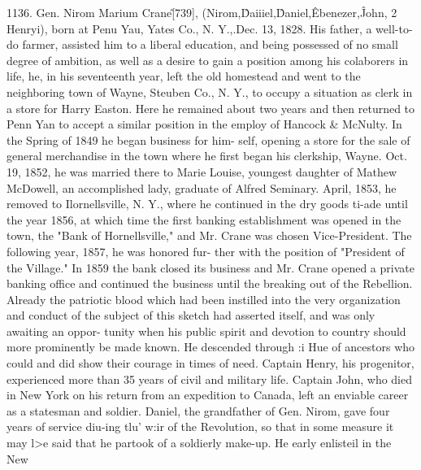 1136. Gen. Nirom Marium Crane\^ [739], (Nirom,\^ Daiiiel,\^ 
Daniel,\^ Ebenezer,\^ John, 2 Henryi), born at Penu Yau, Yates 
Co., N. Y.,.Dec. 13, 1828. His father, a well-to-do farmer, 
assisted him to a liberal education, and being possessed of no 
small degree of ambition, as well as a desire to gain a position 
among his colaborers in life, he, in his seventeenth year, left the old 
homestead and went to the neighboring town of Wayne, Steuben 
Co., N. Y., to occupy a situation as clerk in a store for Harry 
Easton. Here he remained about two years and then returned to 
Penn Yan to accept a similar position in the employ of Hancock 
\& McNulty. In the Spring of 1849 he began business for him- 
self, opening a store for the sale of general merchandise in the 
town where he first began his clerkship, Wayne. Oct. 19, 1852, 
he was married there to Marie Louise, youngest daughter of 
Mathew McDowell, an accomplished lady, graduate of Alfred 
Seminary. April, 1853, he removed to Ilornellsville, N. Y., 
where he continued in the dry goods ti-ade until the year 1856, at 
which time the first banking establishment was opened in the 
town, the "Bank of Hornellsville," and Mr. Crane was chosen 
Vice-President. The following year, 1857, he was honored fur- 
ther with the position of "President of the Village." In 1859 
the bank closed its business and Mr. Crane opened a private 
banking office and continued the business until the breaking out 
of the Rebellion. Already the patriotic blood which had been 
instilled into the very organization and conduct of the subject 
of this sketch had asserted itself, and was only awaiting an oppor- 
tunity when his public spirit and devotion to country should more 
prominently be made known. He descended through :i Hue of 
ancestors who could and did show their courage in times of need. 
Captain Henry, his progenitor, experienced more than 35 years 
of civil and military life. Captain John, who died in New York 
on his return from an expedition to Canada, left an enviable 
career as a statesman and soldier. Daniel, the grandfather of 
Gen. Nirom, gave four years of service diu-ing tlu' w:ir of the 
Revolution, so that in some measure it may l>e said that he 
partook of a soldierly make-up. He early enlisteil in the New 




